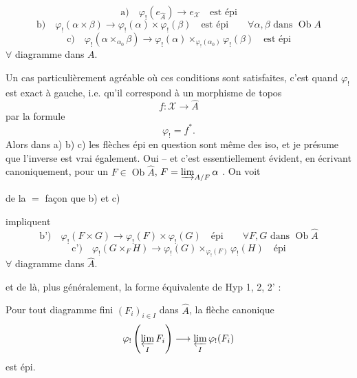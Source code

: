 \[
\text{a)}\quad \varphi_!(e_{\widehat A})\longrightarrow e_{\mathcal X}\quad\text{est épi}
\]
\[
\text{b)}\quad \varphi_!(\alpha\times\beta)\longrightarrow
\varphi_!(\alpha)\times\varphi_!(\beta)\quad\text{est épi}
\qquad \forall\alpha,\beta\text{ dans }\operatorname{Ob}A
\]
\[
\text{c)}\quad \varphi_!(\alpha\times_{\alpha_0}\beta)\longrightarrow
\varphi_!(\alpha)\times_{\varphi_!(\alpha_0)}\varphi_!(\beta)\quad\text{est épi}
\]
$\forall$ diagramme
dans $A$.

Un cas particulièrement agréable où ces conditions sont satisfaites, c'est quand $\varphi_!$ est exact à gauche, i.e. qu'il correspond  à un morphisme de topos
\[
f:\mathcal X\longrightarrow\widehat A
\]
par la formule
\[
\varphi_!=f^*.
\]
Alors dans a) b) c) les flèches épi en question sont même des iso, et je présume que l'inverse est vrai également. Oui -- et c'est essentiellement évident, en écrivant canoniquement, pour un $F\in\operatorname{Ob}\widehat A$, $F=\varinjlim_{A/F}\alpha$ \unsure{$\ldots$}. On voit


de la $=$ façon que b) et c)


impliquent
\[
\text{b')}\quad\varphi_!(F\times G)\longrightarrow\varphi_!(F)\times\varphi_!(G)\quad\text{épi}
\qquad\forall F,G\text{ dans }\operatorname{Ob}\widehat A
\]
\[
\text{c')}\quad\varphi_!(G\times_F H)\longrightarrow
\varphi_!(G)\times_{\varphi_!(F)}\varphi_!(H)\quad\text{épi}
\]
$\forall$ diagramme
dans $\widehat A$.

et de là, plus généralement, la forme équivalente  de Hyp 1, 2, 2' :

Pour tout diagramme fini $(F_i)_{i\in I}$ dans $\widehat A$, la flèche canonique
\[
\varphi_!\left(\varprojlim_I F_i\right)\longrightarrow\varprojlim_I\varphi_!(F_i)
\]
est épi.

